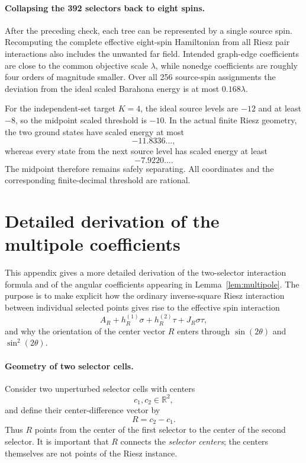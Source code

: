 \documentclass[12pt,a4paper]{article}
\begin{document}
\paragraph{Collapsing the 392 selectors back to eight spins.}
After the preceding check, each tree can be represented by a single source spin.  Recomputing the complete effective eight-spin Hamiltonian from all Riesz pair interactions also includes the unwanted far field.  Intended graph-edge coefficients are close to the common objective scale $\lambda$, while nonedge coefficients are roughly four orders of magnitude smaller.  Over all 256 source-spin assignments the deviation from the ideal scaled Barahona energy is at most $0.168\lambda$.

For the independent-set target $K=4$, the ideal source levels are $-12$ and at least $-8$, so the midpoint scaled threshold is $-10$.  In the actual finite Riesz geometry, the two ground states have scaled energy at most
\[
 -11.8336\ldots,
\]
whereas every state from the next source level has scaled energy at least
\[
 -7.9220\ldots.
\]
The midpoint therefore remains safely separating.  All coordinates and the corresponding finite-decimal threshold are rational.

\section{Detailed derivation of the multipole coefficients}
\label{app:multipole}

This appendix gives a more detailed derivation of the two-selector
interaction formula and of the angular coefficients appearing in
Lemma~\ref{lem:multipole}.  The purpose is to make explicit how the
ordinary inverse-square Riesz interaction between individual selected
points gives rise to the effective spin interaction
\[
A_R+h_R^{(1)}\sigma+h_R^{(2)}\tau+J_R\sigma\tau,
\]
and why the orientation of the center vector $R$ enters through
$\sin(2\theta)$ and $\sin^2(2\theta)$.

\paragraph{Geometry of two selector cells.}

Consider two unperturbed selector cells with centers
\[
c_1,c_2\in\mathbb R^2,
\]
and define their center-difference vector by
\begin{equation}
\label{eq:app-Rdef}
R=c_2-c_1.
\end{equation}
Thus $R$ points from the center of the first selector to the center
of the second selector.  It is important that $R$ connects the
\emph{selector centers}; the centers themselves are not points of the
Riesz instance.
\end{document}
